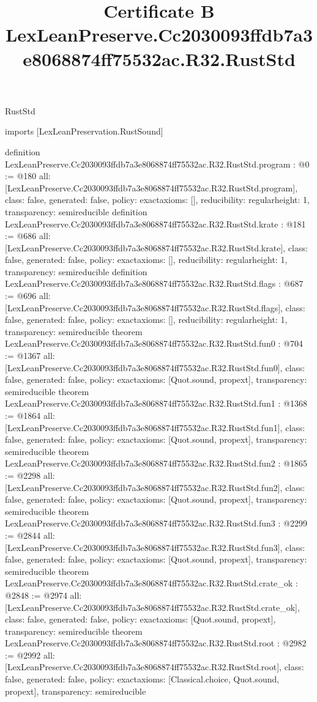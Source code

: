 \begin{lexlean}{RustStd}
\title{Certificate B LexLeanPreserve.Cc2030093ffdb7a3e8068874ff75532ac.R32.RustStd}
\begin{coremodule}
imports [LexLeanPreservation.RustSound]

definition LexLeanPreserve.Cc2030093ffdb7a3e8068874ff75532ac.R32.RustStd.program : @0 := @180 {
  all: [LexLeanPreserve.Cc2030093ffdb7a3e8068874ff75532ac.R32.RustStd.program],
  class: false,
  generated: false,
  policy: exact{axioms: []},
  reducibility: regular{height: 1},
  transparency: semireducible
}
definition LexLeanPreserve.Cc2030093ffdb7a3e8068874ff75532ac.R32.RustStd.krate : @181 := @686 {
  all: [LexLeanPreserve.Cc2030093ffdb7a3e8068874ff75532ac.R32.RustStd.krate],
  class: false,
  generated: false,
  policy: exact{axioms: []},
  reducibility: regular{height: 1},
  transparency: semireducible
}
definition LexLeanPreserve.Cc2030093ffdb7a3e8068874ff75532ac.R32.RustStd.flags : @687 := @696 {
  all: [LexLeanPreserve.Cc2030093ffdb7a3e8068874ff75532ac.R32.RustStd.flags],
  class: false,
  generated: false,
  policy: exact{axioms: []},
  reducibility: regular{height: 1},
  transparency: semireducible
}
theorem LexLeanPreserve.Cc2030093ffdb7a3e8068874ff75532ac.R32.RustStd.fun0 : @704 := @1367 {
  all: [LexLeanPreserve.Cc2030093ffdb7a3e8068874ff75532ac.R32.RustStd.fun0],
  class: false,
  generated: false,
  policy: exact{axioms: [Quot.sound, propext]},
  transparency: semireducible
}
theorem LexLeanPreserve.Cc2030093ffdb7a3e8068874ff75532ac.R32.RustStd.fun1 : @1368 := @1864 {
  all: [LexLeanPreserve.Cc2030093ffdb7a3e8068874ff75532ac.R32.RustStd.fun1],
  class: false,
  generated: false,
  policy: exact{axioms: [Quot.sound, propext]},
  transparency: semireducible
}
theorem LexLeanPreserve.Cc2030093ffdb7a3e8068874ff75532ac.R32.RustStd.fun2 : @1865 := @2298 {
  all: [LexLeanPreserve.Cc2030093ffdb7a3e8068874ff75532ac.R32.RustStd.fun2],
  class: false,
  generated: false,
  policy: exact{axioms: [Quot.sound, propext]},
  transparency: semireducible
}
theorem LexLeanPreserve.Cc2030093ffdb7a3e8068874ff75532ac.R32.RustStd.fun3 : @2299 := @2844 {
  all: [LexLeanPreserve.Cc2030093ffdb7a3e8068874ff75532ac.R32.RustStd.fun3],
  class: false,
  generated: false,
  policy: exact{axioms: [Quot.sound, propext]},
  transparency: semireducible
}
theorem LexLeanPreserve.Cc2030093ffdb7a3e8068874ff75532ac.R32.RustStd.crate_ok : @2848 := @2974 {
  all: [LexLeanPreserve.Cc2030093ffdb7a3e8068874ff75532ac.R32.RustStd.crate_ok],
  class: false,
  generated: false,
  policy: exact{axioms: [Quot.sound, propext]},
  transparency: semireducible
}
theorem LexLeanPreserve.Cc2030093ffdb7a3e8068874ff75532ac.R32.RustStd.root : @2982 := @2992 {
  all: [LexLeanPreserve.Cc2030093ffdb7a3e8068874ff75532ac.R32.RustStd.root],
  class: false,
  generated: false,
  policy: exact{axioms: [Classical.choice, Quot.sound, propext]},
  transparency: semireducible
}


\end{coremodule}
\end{lexlean}
